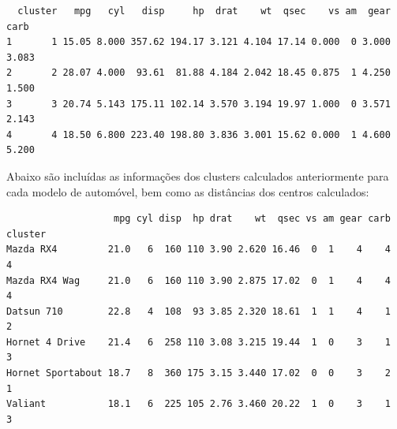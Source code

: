 \documentclass[12pt,brazil,oneside]{book}
\newenvironment{Shaded}{\begin{snugshade}}{\end{snugshade}}
\newcommand{\DataTypeTok}[1]{\textcolor[rgb]{0.13,0.29,0.53}{#1}}
\newcommand{\KeywordTok}[1]{\textcolor[rgb]{0.13,0.29,0.53}{\textbf{#1}}}
\newcommand{\NormalTok}[1]{#1}
\newcommand{\OperatorTok}[1]{\textcolor[rgb]{0.81,0.36,0.00}{\textbf{#1}}}
\begin{document}
\begin{Shaded}
\end{Shaded}

\begin{verbatim}
  cluster   mpg   cyl   disp     hp  drat    wt  qsec    vs am  gear  carb
1       1 15.05 8.000 357.62 194.17 3.121 4.104 17.14 0.000  0 3.000 3.083
2       2 28.07 4.000  93.61  81.88 4.184 2.042 18.45 0.875  1 4.250 1.500
3       3 20.74 5.143 175.11 102.14 3.570 3.194 19.97 1.000  0 3.571 2.143
4       4 18.50 6.800 223.40 198.80 3.836 3.001 15.62 0.000  1 4.600 5.200
\end{verbatim}

Abaixo são incluídas as informações dos clusters calculados anteriormente para cada modelo de automóvel, bem como as distâncias dos centros calculados:

\begin{Shaded}
\end{Shaded}

\begin{verbatim}
                   mpg cyl disp  hp drat    wt  qsec vs am gear carb cluster
Mazda RX4         21.0   6  160 110 3.90 2.620 16.46  0  1    4    4       4
Mazda RX4 Wag     21.0   6  160 110 3.90 2.875 17.02  0  1    4    4       4
Datsun 710        22.8   4  108  93 3.85 2.320 18.61  1  1    4    1       2
Hornet 4 Drive    21.4   6  258 110 3.08 3.215 19.44  1  0    3    1       3
Hornet Sportabout 18.7   8  360 175 3.15 3.440 17.02  0  0    3    2       1
Valiant           18.1   6  225 105 2.76 3.460 20.22  1  0    3    1       3
\end{verbatim}

\begin{Shaded}
\end{Shaded}
\end{document}
